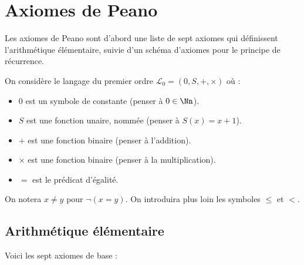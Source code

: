 \documentclass[11pt,class=report,crop=false]{standalone}
\begin{document}
\section{Axiomes de Peano}


Les axiomes de Peano sont d'abord une liste de sept axiomes qui définissent l'arithmétique élémentaire, suivie d'un schéma d'axiomes pour le principe de récurrence.

On considère le langage du premier ordre $\mathcal{L}_0 = (0, S, +, \times)$ où :
\begin{itemize}
	\item $0$ est un symbole de constante (penser à $0 \in \Nn$).
	\item $S$ est une fonction unaire, nommée  (penser à $S(x) = x+1$).
	\item $+$ est une fonction binaire (penser à l'addition).
	\item $\times$ est une fonction binaire (penser à la multiplication).
	\item $=$ est le prédicat d'égalité.
\end{itemize}

On notera $x \neq y$ pour $\lnot(x=y)$. On introduira plus loin les symboles $\le$ et $<$.

\subsection{Arithmétique élémentaire}


Voici les sept axiomes de base :
\end{document}
